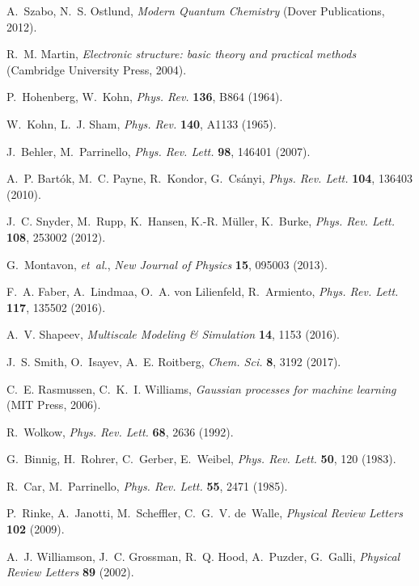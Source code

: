 \documentclass[12pt]{article}
\begin{document}

\begin{thebibliography}{10}

A.~Szabo, N.~S. Ostlund, {\it Modern Quantum Chemistry\/} (Dover Publications,
  2012).

R.~M. Martin, {\it Electronic structure: basic theory and practical methods\/}
  (Cambridge University Press, 2004).

P.~Hohenberg, W.~Kohn, {\it Phys. Rev.\/} {\bf 136}, B864 (1964).

W.~Kohn, L.~J. Sham, {\it Phys. Rev.\/} {\bf 140}, A1133 (1965).

J.~Behler, M.~Parrinello, {\it Phys. Rev. Lett.\/} {\bf 98}, 146401 (2007).

A.~P. Bart{\'{o}}k, M.~C. Payne, R.~Kondor, G.~Cs{\'{a}}nyi, {\it Phys. Rev.
  Lett.\/} {\bf 104}, 136403 (2010).

J.~C. Snyder, M.~Rupp, K.~Hansen, K.-R. M{\"{u}}ller, K.~Burke, {\it Phys. Rev.
  Lett.\/} {\bf 108}, 253002 (2012).

G.~Montavon, {\it et~al.\/}, {\it New Journal of Physics\/} {\bf 15}, 095003
  (2013).

F.~A. Faber, A.~Lindmaa, O.~A. von Lilienfeld, R.~Armiento, {\it Phys. Rev.
  Lett.\/} {\bf 117}, 135502 (2016).

A.~V. Shapeev, {\it Multiscale Modeling {\&} Simulation\/} {\bf 14}, 1153
  (2016).

J.~S. Smith, O.~Isayev, A.~E. Roitberg, {\it Chem. Sci.\/} {\bf 8}, 3192
  (2017).

C.~E. Rasmussen, C.~K.~I. Williams, {\it Gaussian processes for machine
  learning\/} (MIT Press, 2006).

R.~Wolkow, {\it Phys. Rev. Lett.\/} {\bf 68}, 2636 (1992).

G.~Binnig, H.~Rohrer, C.~Gerber, E.~Weibel, {\it Phys. Rev. Lett.\/} {\bf 50},
  120 (1983).

R.~Car, M.~Parrinello, {\it Phys. Rev. Lett.\/} {\bf 55}, 2471 (1985).

P.~Rinke, A.~Janotti, M.~Scheffler, C.~G.~V. de~Walle, {\it Physical Review
  Letters\/} {\bf 102} (2009).

A.~J. Williamson, J.~C. Grossman, R.~Q. Hood, A.~Puzder, G.~Galli, {\it
  Physical Review Letters\/} {\bf 89} (2002).


\end{thebibliography}
\end{document}
